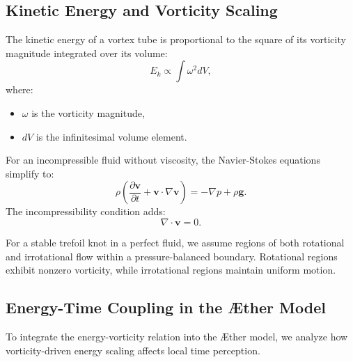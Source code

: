 \documentclass[a4paper,10pt]{article}
\begin{document}
    \subsection*{Kinetic Energy and Vorticity Scaling}
    The kinetic energy of a vortex tube is proportional to the square of its vorticity magnitude integrated over its volume:
    \begin{equation*}
        E_k \propto \int \omega^2 dV,
    \end{equation*}
    where:
    \begin{itemize}
        \item $\omega$ is the vorticity magnitude,
        \item $dV$ is the infinitesimal volume element.
    \end{itemize}
    For an incompressible fluid without viscosity, the Navier-Stokes equations simplify to:
    \begin{equation*}
        \rho \left( \frac{\partial \mathbf{v}}{\partial t} + \mathbf{v} \cdot \nabla \mathbf{v} \right) = - \nabla p + \rho \mathbf{g}.
    \end{equation*}
    The incompressibility condition adds:
    \begin{equation*}
        \nabla \cdot \mathbf{v} = 0.
    \end{equation*}

    For a stable trefoil knot in a perfect fluid, we assume regions of both rotational and irrotational flow within a pressure-balanced boundary. Rotational regions exhibit nonzero vorticity, while irrotational regions maintain uniform motion.

    \subsection*{Energy-Time Coupling in the Æther Model}
    To integrate the energy-vorticity relation into the Æther model, we analyze how vorticity-driven energy scaling affects local time perception.
\end{document}
